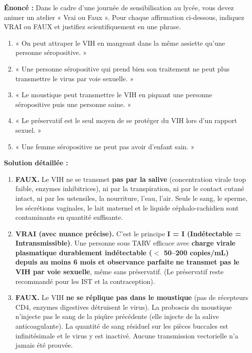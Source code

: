 \documentclass[11pt]{article}
\begin{document}
\begin{exoresolu}
\textbf{Énoncé :} Dans le cadre d'une journée de sensibilisation au lycée, vous devez animer un atelier « Vrai ou Faux ». Pour chaque affirmation ci-dessous, indiquez VRAI ou FAUX et justifiez scientifiquement en une phrase.
\begin{enumerate}
    \item « On peut attraper le VIH en mangeant dans la même assiette qu'une personne séropositive. »
    \item « Une personne séropositive qui prend bien son traitement ne peut plus transmettre le virus par voie sexuelle. »
    \item « Le moustique peut transmettre le VIH en piquant une personne séropositive puis une personne saine. »
    \item « Le préservatif est le seul moyen de se protéger du VIH lors d'un rapport sexuel. »
    \item « Une femme séropositive ne peut pas avoir d'enfant sain. »
\end{enumerate}
\tcblower
\textbf{Solution détaillée :}
\begin{enumerate}
    \item \textbf{FAUX.} Le VIH ne se transmet \textbf{pas par la salive} (concentration virale trop faible, enzymes inhibitrices), ni par la transpiration, ni par le contact cutané intact, ni par les ustensiles, la nourriture, l'eau, l'air. Seuls le sang, le sperme, les sécrétions vaginales, le lait maternel et le liquide céphalo-rachidien sont contaminants en quantité suffisante.
    \item \textbf{VRAI (avec nuance précise).} C'est le principe \textbf{I = I (Indétectable = Intransmissible)}. Une personne sous TARV efficace avec \textbf{charge virale plasmatique durablement indétectable ($<$ 50--200 copies/mL) depuis au moins 6 mois et observance parfaite} \textbf{ne transmet pas le VIH par voie sexuelle}, même sans préservatif. (Le préservatif reste recommandé pour les IST et la contraception).
    \item \textbf{FAUX.} Le VIH \textbf{ne se réplique pas dans le moustique} (pas de récepteurs CD4, enzymes digestives détruisent le virus). La proboscis du moustique n'injecte pas le sang de la piqûre précédente (elle injecte de la salive anticoagulante). La quantité de sang résiduel sur les pièces buccales est infinitésimale et le virus y est inactivé. Aucune transmission vectorielle n'a jamais été prouvée.

\end{enumerate}
\end{exoresolu}
\end{document}

